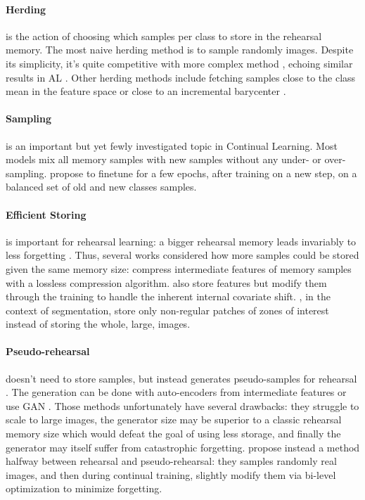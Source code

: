 \paragraph{Herding} is the action of choosing which samples per class to store in the rehearsal
memory. The most naive herding method is to sample randomly images. Despite its simplicity, it's
quite competitive with more complex method \citep{castro2018end_to_end_inc_learn}, echoing similar
results in \ac{AL} \citep{gal2017activelearning}. Other herding methods include fetching samples
close to the class mean in the feature space \citep{castro2018end_to_end_inc_learn} or close to an
incremental barycenter \citep{rebuffi2017icarl}.

\paragraph{Sampling} is an important but yet fewly investigated topic in Continual Learning. Most
models mix all memory samples with new samples without any under- or over-sampling.
\cite{castro2018end_to_end_inc_learn} propose to finetune for a few epochs, after training on a new
step, on a balanced set of old and new classes samples. 

\paragraph{Efficient Storing} is important for rehearsal learning: a bigger rehearsal memory leads
invariably to less forgetting \citep{douillard2020podnet}. Thus, several works considered how more
samples could be stored given the same memory size: \cite{hayes2020remind} compress intermediate
features of memory samples with a lossless compression algorithm.
\cite{iscen2020incrementalfeatureadaptation} also store features but modify them through the
training to handle the inherent internal covariate shift. \cite{douillard2021objectrehearsal}, in
the context of segmentation, store only non-regular patches of zones of interest instead of storing
the whole, large, images.

\paragraph{Pseudo-rehearsal} doesn't need to store samples, but instead generates pseudo-samples for
rehearsal \citep{lesort2019generative}. The generation can be done with auto-encoders from
intermediate features \citep{kemker2018fearnet,ayub2021eec} or use GAN
\citep{shin2017deep_generative_replay}. Those methods unfortunately have several drawbacks: they
struggle to scale to large images, the generator size may be superior to a classic rehearsal memory
size which would defeat the goal of using less storage, and finally the generator may itself suffer
from catastrophic forgetting. \cite{liu2020mnemonics} propose instead a method halfway between
rehearsal and pseudo-rehearsal: they samples randomly real images, and then during continual
training, slightly modify them via bi-level optimization to minimize forgetting.


